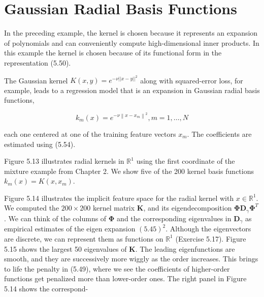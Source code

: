 \documentclass[10pt]{article}
\begin{document}
\section*{Gaussian Radial Basis Functions}
In the preceding example, the kernel is chosen because it represents an expansion of polynomials and can conveniently compute high-dimensional inner products. In this example the kernel is chosen because of its functional form in the representation (5.50).

The Gaussian kernel $K(x, y)=e^{-\nu| | x-y| |^{2}}$ along with squared-error loss, for example, leads to a regression model that is an expansion in Gaussian radial basis functions,


\begin{equation*}
k_{m}(x)=e^{-\nu\left\|x-x_{m}\right\|^{2}}, m=1, \ldots, N \tag{5.64}
\end{equation*}


each one centered at one of the training feature vectors $x_{m}$. The coefficients are estimated using (5.54).

Figure 5.13 illustrates radial kernels in $\mathbb{R}^{1}$ using the first coordinate of the mixture example from Chapter 2. We show five of the 200 kernel basis functions $k_{m}(x)=K\left(x, x_{m}\right)$.

Figure 5.14 illustrates the implicit feature space for the radial kernel with $x \in \mathbb{R}^{1}$. We computed the $200 \times 200$ kernel matrix $\mathbf{K}$, and its eigendecomposition $\boldsymbol{\Phi} \mathbf{D}_{\gamma} \boldsymbol{\Phi}^{T}$. We can think of the columns of $\boldsymbol{\Phi}$ and the corresponding eigenvalues in $\mathbf{D}_{\gamma}$ as empirical estimates of the eigen expansion $(5.45)^{2}$. Although the eigenvectors are discrete, we can represent them as functions on $\mathbb{R}^{1}$ (Exercise 5.17). Figure 5.15 shows the largest 50 eigenvalues of $\mathbf{K}$. The leading eigenfunctions are smooth, and they are successively more wiggly as the order increases. This brings to life the penalty in (5.49), where we see the coefficients of higher-order functions get penalized more than lower-order ones. The right panel in Figure 5.14 shows the correspond-
\end{document}
